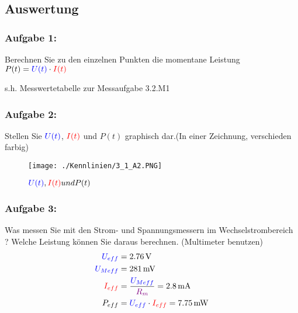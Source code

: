 \documentclass[a4paper,titlepage,parskip]{scrreprt}
\newcommand{\spannung}[1]{\textcolor{blue}{#1}}
\newcommand{\strom}[1]{\textcolor{red}{#1}}
\newcommand{\widerstand}[1]{\textcolor{violet}{#1}}
\begin{document}
            
            \subsection{Auswertung}
                \subsubsection{Aufgabe 1:}  Berechnen Sie zu den einzelnen Punkten die momentane Leistung $P(t) = \spannung{U(t)} \cdot \strom{I(t)}$ 
                    
                    s.h. Messwertetabelle zur Messaufgabe 3.2.M1
                    \pagebreak
                \subsubsection{Aufgabe 2:}   Stellen Sie $\spannung{U(t)}$, $\strom{I(t)}$ und $P(t)$ graphisch dar.(In einer Zeichnung, verschieden farbig)
                
				\begin{figure}[!htbp]
              		\begin{center}
                  		\texttt{[image: ./Kennlinien/3\_1\_A2.PNG]}
                	\end{center}
                	\caption{$\spannung{U(t)}, \strom{I(t)} und P(t)$}
                	\label{fig:1_1_A1}
            	\end{figure}                
                
                \subsubsection{Aufgabe 3:}  Was messen Sie mit den Strom- und Spannungsmessern im Wechselstrombereich ? Welche Leistung können Sie daraus berechnen. (Multimeter benutzen)
                \begin{align*}
                \spannung{U_{eff}} &= \SI{2,76}{\volt}\\
                \spannung{U_{Meff}} &= \SI{281}{\milli\volt}\\
                \strom{I_{eff}} &= \frac{\spannung{U_{Meff}}}{\widerstand{R_m}} = \SI{2,8}{\milli\ampere}\\
                P_{eff} &=  \spannung{U_{eff}} \cdot \strom{I_{eff}} = \SI{7,75}{\milli\watt}
                \end{align*}
     			\pagebreak
\end{document}
